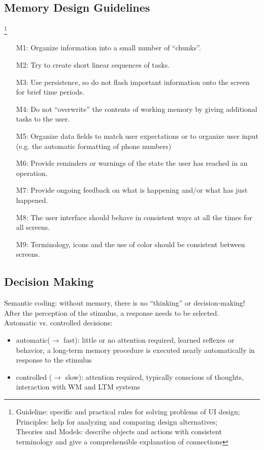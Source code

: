 \subsection{Memory Design Guidelines}\footnote{Guideline: specific and practical rules for solving problems of UI design;\\ Principles: help for analyzing and comparing design alternatives;\\
Theories and Models: describe objects and actions with consistent terminology and give a comprehensible explanation of connections}
\begin{itemize}
\item[M1:] Organize information into a small number of ``chunks''.
\item[M2:] Try to create short linear sequences of tasks.
\item[M3:] Use persistence, so do not flash important information onto the screen for brief time periods.
\item[M4:] Do not ``overwrite'' the contents of working memory by giving additional tasks to the user.
\item[M5:] Organize data fields to match user expectations or to organize user input (e.g. the automatic formatting of phone numbers)
\item[M6:] Provide reminders or warnings of the state the user has reached in an operation.
\item[M7:] Provide ongoing feedback on what is happening and/or what has just happened.
\item[M8:] The user interface should behave in consistent ways at all the times for all screens.
\item[M9:] Terminology, icons and the use of color should be consistent between screens.
\end{itemize}

\subsection{Decision Making}
Semantic coding: without memory, there is no ``thinking'' or decision-making! After the perception of the stimulus, a response needs to be selected.\\
Automatic vs. controlled decisions:
\begin{itemize}
\item automatic($\rightarrow$ fast): little or no attention required, learned reflexes or behavior, a long-term memory procedure is executed nearly automatically in response to the stimulus
\item controlled ($\rightarrow$ slow): attention required, typically conscious of thoughts, interaction with WM and LTM systems
\end{itemize}
